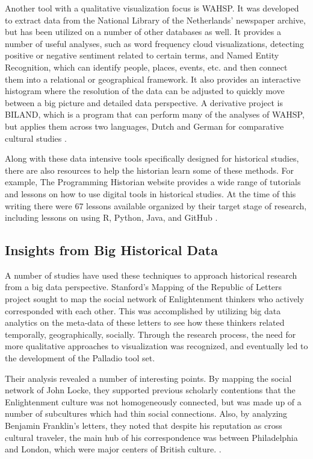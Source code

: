 \documentclass[sigconf]{acmart}
\begin{document}
Another tool with a qualitative visualization focus is WAHSP. It was developed to extract data from the National Library of the Netherlands' newspaper archive, but has been utilized on a number of other databases as well. It provides a number of useful analyses, such as word frequency cloud visualizations, detecting positive or negative sentiment related to certain terms, and Named Entity Recognition, which can identify people, places, events, etc. and then connect them into a relational or geographical framework. It also provides an interactive histogram where the resolution of the data can be adjusted to quickly move between a big picture and detailed data perspective. A derivative project is BILAND, which is a program that can perform many of the analyses of WAHSP, but applies them across two languages, Dutch and German for comparative cultural studies \cite{bdglobalhist}.

Along with these data intensive tools specifically designed for historical studies, there are also resources to help the historian learn some of these methods. For example, The Programming Historian website provides a wide range of tutorials and lessons on how to use digital tools in historical studies. At the time of this writing there were 67 lessons available organized by their target stage of research, including lessons on using R, Python, Java, and GitHub \cite{proghistabout}.

\subsection{Insights from Big Historical Data}
A number of studies have used these techniques to approach historical research from a big data perspective. Stanford's Mapping of the Republic of Letters project sought to map the social network of Enlightenment thinkers who actively corresponded with each other. This was accomplished by utilizing big data analytics on the meta-data of these letters to see how these thinkers related temporally, geographically, socially. Through the research process, the need for more qualitative approaches to visualization was recognized, and eventually led to the development of the Palladio tool set. 

Their analysis revealed a number of interesting points. By mapping the social network of John Locke, they supported previous scholarly contentions that the Enlightenment culture was not homogeneously connected, but was made up of a number of subcultures which had thin social connections. Also, by analyzing Benjamin Franklin's letters, they noted that despite his reputation as cross cultural traveler, the main hub of his correspondence was between Philadelphia and London, which were major centers of British culture. \cite{digitalrepublicletters} .
\end{document}
